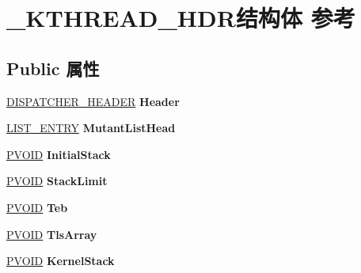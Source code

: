 \hypertarget{struct___k_t_h_r_e_a_d___h_d_r}{}\section{\+\_\+\+K\+T\+H\+R\+E\+A\+D\+\_\+\+H\+D\+R结构体 参考}
\label{struct___k_t_h_r_e_a_d___h_d_r}
\subsection*{Public 属性}
\begin{DoxyCompactItemize}
\item 
\mbox{\label{struct___k_t_h_r_e_a_d___h_d_r_a2a2f0615b9b0f4349f341997e79e333c}} 
\hyperlink{struct___d_i_s_p_a_t_c_h_e_r___h_e_a_d_e_r}{D\+I\+S\+P\+A\+T\+C\+H\+E\+R\+\_\+\+H\+E\+A\+D\+ER} {\bfseries Header}
\item 
\mbox{\label{struct___k_t_h_r_e_a_d___h_d_r_a7a4bf11abe4c1a699650419e954214b3}} 
\hyperlink{struct___l_i_s_t___e_n_t_r_y}{L\+I\+S\+T\+\_\+\+E\+N\+T\+RY} {\bfseries Mutant\+List\+Head}
\item 
\mbox{\label{struct___k_t_h_r_e_a_d___h_d_r_a07354944cf44729404dce992f42358c4}} 
\hyperlink{interfacevoid}{P\+V\+O\+ID} {\bfseries Initial\+Stack}
\item 
\mbox{\label{struct___k_t_h_r_e_a_d___h_d_r_a9974cae10e4b4a0c0fdf717119e543f4}} 
\hyperlink{interfacevoid}{P\+V\+O\+ID} {\bfseries Stack\+Limit}
\item 
\mbox{\label{struct___k_t_h_r_e_a_d___h_d_r_ab8ba67e4bbc98706ed63602660b1eebf}} 
\hyperlink{interfacevoid}{P\+V\+O\+ID} {\bfseries Teb}
\item 
\mbox{\label{struct___k_t_h_r_e_a_d___h_d_r_a6ac71590bae48f21935ba3a41d2cc293}} 
\hyperlink{interfacevoid}{P\+V\+O\+ID} {\bfseries Tls\+Array}
\item 
\mbox{\label{struct___k_t_h_r_e_a_d___h_d_r_acd383426cab1263690d794ea092213df}} 
\hyperlink{interfacevoid}{P\+V\+O\+ID} {\bfseries Kernel\+Stack}

\end{DoxyCompactItemize}

